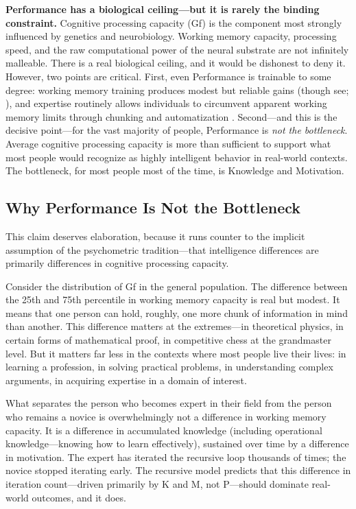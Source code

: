 \documentclass[12pt,a4paper]{article}
\begin{document}
\textbf{Performance has a biological ceiling---\hspace{0pt}but it is rarely the binding constraint.} Cognitive processing capacity (Gf) is the component most strongly influenced by genetics and neurobiology. Working memory capacity, processing speed, and the raw computational power of the neural substrate are not infinitely malleable. There is a real biological ceiling, and it would be dishonest to deny it. However, two points are critical. First, even Performance is trainable to some degree: working memory training produces modest but reliable gains (though see; \citealp{Jaeggi2008,MelbyLervag2013}), and expertise routinely allows individuals to circumvent apparent working memory limits through chunking and automatization \citep{ChaseSimon1973}. Second---\hspace{0pt}and this is the decisive point---\hspace{0pt}for the vast majority of people, Performance is \emph{not the bottleneck}. Average cognitive processing capacity is more than sufficient to support what most people would recognize as highly intelligent behavior in real-world contexts. The bottleneck, for most people most of the time, is Knowledge and Motivation.

\subsection{Why Performance Is Not the Bottleneck}

This claim deserves elaboration, because it runs counter to the implicit assumption of the psychometric tradition---\hspace{0pt}that intelligence differences are primarily differences in cognitive processing capacity.

Consider the distribution of Gf in the general population. The difference between the 25th and 75th percentile in working memory capacity is real but modest. It means that one person can hold, roughly, one more chunk of information in mind than another. This difference matters at the extremes---\hspace{0pt}in theoretical physics, in certain forms of mathematical proof, in competitive chess at the grandmaster level. But it matters far less in the contexts where most people live their lives: in learning a profession, in solving practical problems, in understanding complex arguments, in acquiring expertise in a domain of interest.

What separates the person who becomes expert in their field from the person who remains a novice is overwhelmingly not a difference in working memory capacity. It is a difference in accumulated knowledge (including operational knowledge---\hspace{0pt}knowing how to learn effectively), sustained over time by a difference in motivation. The expert has iterated the recursive loop thousands of times; the novice stopped iterating early. The recursive model predicts that this difference in iteration count---\hspace{0pt}driven primarily by K and M, not P---\hspace{0pt}should dominate real-world outcomes, and it does.
\end{document}
